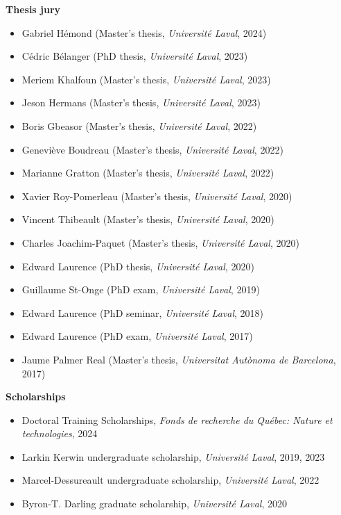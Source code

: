 \documentclass[11pt]{article}
\begin{document}
%
%
%
\textbf{Thesis jury}
%
\begin{itemize}\small
  \item Gabriel Hémond (Master's thesis, \textit{Universit\'e Laval}, 2024)
  \item Cédric Bélanger (PhD thesis, \textit{Universit\'e Laval}, 2023)
  \item Meriem Khalfoun (Master's thesis, \textit{Universit\'e Laval}, 2023)
  \item Jeson Hermans (Master's thesis, \textit{Universit\'e Laval}, 2023)
  \item Boris Gbeasor (Master's thesis, \textit{Universit\'e Laval}, 2022)
  \item Geneviève Boudreau (Master's thesis, \textit{Universit\'e Laval}, 2022)
  \item Marianne Gratton (Master's thesis, \textit{Universit\'e Laval}, 2022)
  \item Xavier Roy-Pomerleau (Master's thesis, \textit{Universit\'e Laval}, 2020)
  \item Vincent Thibeault (Master's thesis, \textit{Universit\'e Laval}, 2020)
  \item Charles Joachim-Paquet (Master's thesis, \textit{Universit\'e Laval}, 2020)
  \item Edward Laurence (PhD thesis, \textit{Universit\'e Laval}, 2020)
  \item Guillaume St-Onge (PhD exam, \textit{Universit\'e Laval}, 2019)
  \item Edward Laurence (PhD seminar, \textit{Universit\'e Laval}, 2018)
  \item Edward Laurence (PhD exam, \textit{Universit\'e Laval}, 2017)
  \item Jaume Palmer Real (Master's thesis, \textit{Universitat Aut\`onoma de Barcelona}, 2017)
\end{itemize}
%
%
%
\textbf{Scholarships}
%
\begin{itemize}\small
  \item Doctoral Training Scholarships, \textit{Fonds de recherche du Québec: Nature et technologies}, 2024
  \item Larkin Kerwin undergraduate scholarship, \textit{Universit\'e Laval}, 2019, 2023
  \item Marcel-Dessureault undergraduate scholarship, \textit{Université Laval}, 2022
  \item Byron-T. Darling graduate scholarship, \textit{Universit\'e Laval}, 2020
\end{itemize}
%
%
%
\end{document}
